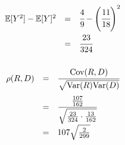 \documentclass[a4paper]{article}
\begin{document}
\begin{equation}
\begin{array}{rll}
\mathbb{E}[Y^2] - \mathbb{E}[Y]^2 & = & \cfrac{4}{9} - \left( \cfrac{11}{18} \right)^2 \\[.15in]
& = & \cfrac{23}{324} \\[.15in]
\end{array}
\end{equation}

\begin{equation}
\begin{array}{rll}
\rho(R,D) & = & \cfrac{\mbox{Cov}(R,D)}{\sqrt{\mbox{Var}(R)\mbox{Var}(D)}} \\[.2in]
& = & \cfrac{\frac{107}{162}}{\sqrt{\frac{23}{324} \cdot \frac{13}{162}}} \\[.2in]
& = & 107\sqrt{\frac{2}{299}}
\end{array}
\end{equation}
\end{document}
